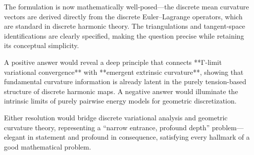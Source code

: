 The formulation is now mathematically well-posed—the discrete mean curvature vectors are derived directly from the discrete Euler–Lagrange operators, which are standard in discrete harmonic theory.  The triangulations and tangent-space identifications are clearly specified, making the question precise while retaining its conceptual simplicity.  

A positive answer would reveal a deep principle that connects **Γ-limit variational convergence** with **emergent extrinsic curvature**, showing that fundamental curvature information is already latent in the purely tension-based structure of discrete harmonic maps.  A negative answer would illuminate the intrinsic limits of purely pairwise energy models for geometric discretization.  

Either resolution would bridge discrete variational analysis and geometric curvature theory, representing a “narrow entrance, profound depth” problem—elegant in statement and profound in consequence, satisfying every hallmark of a good mathematical problem.